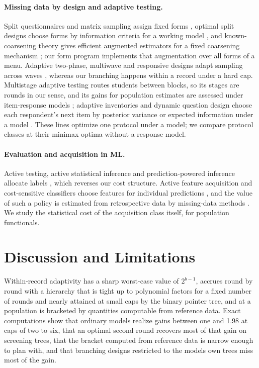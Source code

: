 \documentclass{article}
\begin{document}
\paragraph{Missing data by design and adaptive testing.} Split questionnaires and matrix sampling assign fixed forms \citep{raghunathan1995,graham2006,thomas2006,chipperfield2009,rhemtulla2012}, optimal split designs choose forms by information criteria for a working model \citep{adiguzel2008}, and known-coarsening theory gives efficient augmented estimators for a fixed coarsening mechanism \citep{robins1994,tsiatis2006}; our form program implements that augmentation over all forms of a menu. Adaptive two-phase, multiwave and responsive designs adapt sampling across waves \citep{groves2006,tao2020,chen2020,chen2022}, whereas our branching happens within a record under a hard cap. Multistage adaptive testing routes students between blocks, so its stages are rounds in our sense, and its gains for population estimates are assessed under item-response models \citep{yamamoto2018,fink2024,konig2026}; adaptive inventories and dynamic question design choose each respondent's next item by posterior variance or expected information under a model \citep{montgomery2020,zhang2020,fukuda2026}. These lines optimize one protocol under a model; we compare protocol classes at their minimax optima without a response model.

\paragraph{Evaluation and acquisition in ML.} Active testing, active statistical inference and prediction-powered inference allocate labels \citep{kossen2021,zrnic2024,angelopoulos2023}, which reverses our cost structure. Active feature acquisition and cost-sensitive classifiers choose features for individual predictions \citep{turney1995,trapeznikov2013,nan2017,ma2019,covert2023}, and the value of such a policy is estimated from retrospective data by missing-data methods \citep{vonkleist2025}. We study the statistical cost of the acquisition class itself, for population functionals.

\section{Discussion and Limitations}\label{sec:discussion}
Within-record adaptivity has a sharp worst-case value of $2^{b-1}$, accrues round by round with a hierarchy that is tight up to polynomial factors for a fixed number of rounds and nearly attained at small caps by the binary pointer tree, and at a population is bracketed by quantities computable from reference data. Exact computations show that ordinary models realize gains between one and 1.98 at caps of two to six, that an optimal second round recovers most of that gain on screening trees, that the bracket computed from reference data is narrow enough to plan with, and that branching designs restricted to the models\textquotesingle{} own trees miss most of the gain.
\end{document}
